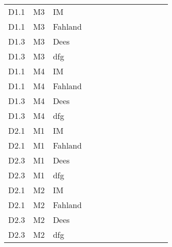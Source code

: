 \begin{table}[]
{\begin{tabular}{lll|llllllll|ll}
			D1.1      & M3              & IM  &     &    &     &     &        &           &          &      &                   &                     \\
			D1.1      & M3              & Fahland   &     &    &     &     &        &           &          &      &                   &                     \\
			D1.3      & M3              & Dees      &     &    &     &     &        &           &          &      &                   &                     \\
			D1.3      & M3              & dfg       &     &    &     &     &        &           &          &      &                   &                     \\
			D1.1      & M4              & IM  &     &    &     &     &        &           &          &      &                   &                     \\
			D1.1      & M4              & Fahland   &     &    &     &     &        &           &          &      &                   &                     \\
			D1.3      & M4              & Dees      &     &    &     &     &        &           &          &      &                   &                     \\
			D1.3      & M4              & dfg       &     &    &     &     &        &           &          &      &                   &                     \\
			D2.1      & M1              & IM &     &    &     &     &        &           &          &      &                   &                     \\
			D2.1      & M1              & Fahland   &     &    &     &     &        &           &          &      &                   &                     \\
			D2.3      & M1              & Dees      &     &    &     &     &        &           &          &      &                   &                     \\
			D2.3      & M1              & dfg       &     &    &     &     &        &           &          &      &                   &                     \\
			D2.1      & M2              & IM  &     &    &     &     &        &           &          &      &                   &                     \\
			D2.1      & M2              & Fahland   &     &    &     &     &        &           &          &      &                   &                     \\
			D2.3      & M2              & Dees      &     &    &     &     &        &           &          &      &                   &                     \\
			D2.3      & M2              & dfg       &     &    &     &     &        &           &          &      &                   &      
			\\ \hline              
		\end{tabular}}
	
	\end{table}
